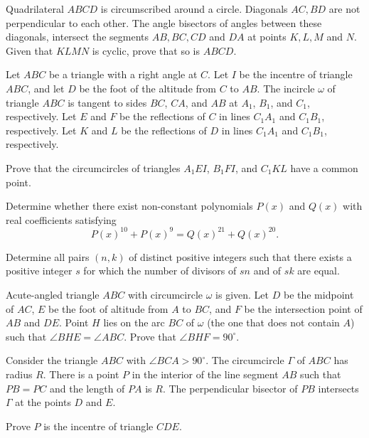 \documentclass[11pt]{scrartcl}
\begin{document}
\begin{problem}[3982719612496247400]
	Quadrilateral $ABCD$ is circumscribed around a circle. Diagonals $AC,BD$ are not perpendicular to each other. The angle bisectors of angles between these diagonals, intersect the segments $AB,BC,CD$ and $DA$ at points $K,L,M$ and $N$. Given that $KLMN$ is cyclic, prove that so is $ABCD$.
\end{problem}
\begin{problem}[6206024898840097202]
Let $ABC$ be a triangle with a right angle at $C$. Let $I$ be the incentre of triangle $ABC$, and let $D$ be the foot of the altitude from $C$ to $AB$. The incircle $\omega$ of triangle $ABC$ is tangent to sides $BC$, $CA$, and $AB$ at $A_1$, $B_1$, and $C_1$, respectively. Let $E$ and $F$ be the reflections of $C$ in lines $C_1A_1$ and $C_1B_1$, respectively. Let $K$ and $L$ be the reflections of $D$ in lines $C_1A_1$ and $C_1B_1$, respectively.

Prove that the circumcircles of triangles $A_1EI$, $B_1FI$, and $C_1KL$ have a common point.
\end{problem}
\begin{problem}[254414643421075]
Determine whether there exist non-constant polynomials $P(x)$ and $Q(x)$ with real coefficients satisfying
$$P(x)^{10}+P(x)^9 = Q(x)^{21}+Q(x)^{20}.$$
\end{problem}
\begin{problem}[569685816807741]
Determine all pairs $(n, k)$ of distinct positive integers such that there exists a positive integer $s$ for which the number of divisors of $sn$ and of $sk$ are equal.
\end{problem}
\begin{problem}[371185267312965]
Acute-angled triangle $ABC$ with circumcircle $\omega$ is given. Let $D$ be the midpoint of $AC$, $E$ be the foot of altitude from $A$ to $BC$, and $F$ be the intersection point of $AB$ and $DE$. Point $H$ lies on the arc $BC$ of $\omega$ (the one that does not contain $A$) such that $\angle BHE=\angle ABC$. Prove that $\angle BHF=90^\circ$.
\end{problem}
\begin{problem}[6002187361907355959]
	Consider the triangle $ABC$ with $\angle BCA > 90^{\circ}$. The circumcircle $\Gamma$ of $ABC$ has radius $R$. There is a point $P$ in the interior of the line segment $AB$ such that $PB = PC$ and the length of $PA$ is $R$. The perpendicular bisector of $PB$ intersects $\Gamma$ at the points $D$ and $E$.

Prove $P$ is the incentre of triangle $CDE$.
\end{problem}
\end{document}
